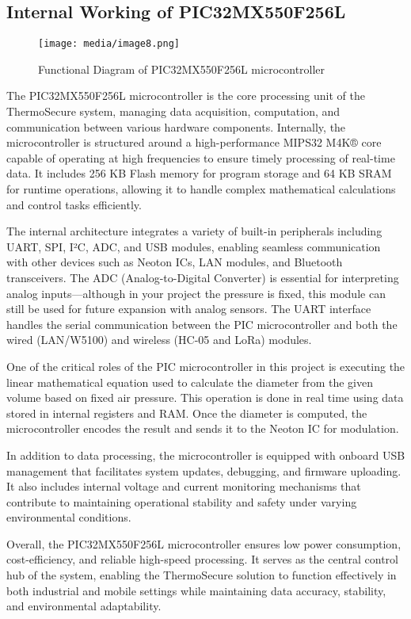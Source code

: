 \documentclass[12pt]{report}
\begin{document}
\subsection{Internal Working of PIC32MX550F256L}
\begin{figure}[ht]
    \centering
    \texttt{[image: media/image8.png]}
    \caption{Functional Diagram of PIC32MX550F256L microcontroller}
    \label{fig:pic_diagram}
\end{figure}

The PIC32MX550F256L microcontroller is the core processing unit of the ThermoSecure system, managing data acquisition, computation, and communication between various hardware components. Internally, the microcontroller is structured around a high-performance MIPS32 M4K® core capable of operating at high frequencies to ensure timely processing of real-time data. It includes 256 KB Flash memory for program storage and 64 KB SRAM for runtime operations, allowing it to handle complex mathematical calculations and control tasks efficiently.

The internal architecture integrates a variety of built-in peripherals including UART, SPI, I²C, ADC, and USB modules, enabling seamless communication with other devices such as Neoton ICs, LAN modules, and Bluetooth transceivers. The ADC (Analog-to-Digital Converter) is essential for interpreting analog inputs—although in your project the pressure is fixed, this module can still be used for future expansion with analog sensors. The UART interface handles the serial communication between the PIC microcontroller and both the wired (LAN/W5100) and wireless (HC-05 and LoRa) modules.

One of the critical roles of the PIC microcontroller in this project is executing the linear mathematical equation used to calculate the diameter from the given volume based on fixed air pressure. This operation is done in real time using data stored in internal registers and RAM. Once the diameter is computed, the microcontroller encodes the result and sends it to the Neoton IC for modulation.

In addition to data processing, the microcontroller is equipped with onboard USB management that facilitates system updates, debugging, and firmware uploading. It also includes internal voltage and current monitoring mechanisms that contribute to maintaining operational stability and safety under varying environmental conditions.

Overall, the PIC32MX550F256L microcontroller ensures low power consumption, cost-efficiency, and reliable high-speed processing. It serves as the central control hub of the system, enabling the ThermoSecure solution to function effectively in both industrial and mobile settings while maintaining data accuracy, stability, and environmental adaptability.
\end{document}
